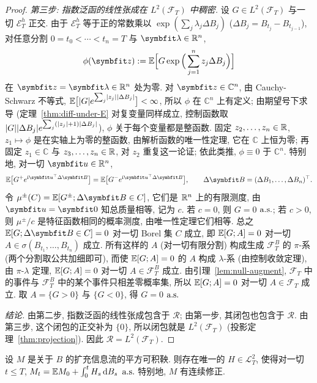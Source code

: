 \begin{proof}
\emph{第三步: 指数泛函的线性张成在 $L^2(\mathcal{F}_T)$ 中稠密.} 设 $G\in L^2(\mathcal{F}_T)$ 与一切 $\mathscr{E}^h_T$ 正交. 由于 $\mathscr{E}^h_T$ 等于正的常数乘以 $\exp(\sum_j\lambda_j\Delta B_j)$ ($\Delta B_j=B_{t_j}-B_{t_{j-1}}$), 对任意分割 $0=t_0<\cdots<t_n=T$ 与 $\rvec{\lambda}\in\R^n$,
\[
\phi(\rvec{z}):=\E\Big[G\exp\Big(\sum_{j=1}^nz_j\Delta B_j\Big)\Big]
\]
在 $\rvec{z}=\rvec{\lambda}\in\R^n$ 处为零. 对 $\rvec{z}\in\mathbb{C}^n$, 由 Cauchy-Schwarz 不等式, $\mathbb{E}\big[\lvert G\rvert e^{\sum_j\lvert z_j\rvert\lvert\Delta B_j\rvert}\big]<\infty$, 所以 $\phi$ 在 $\mathbb{C}^n$ 上有定义; 由期望号下求导 (定理~\ref{thm:diff-under-E} 对复变量同样成立, 控制函数取 $\lvert G\rvert\lvert\Delta B_j\rvert e^{\sum_j(\lvert z_j\rvert+1)\lvert\Delta B_j\rvert}$), $\phi$ 关于每个变量都是整函数. 固定 $z_2,\dots,z_n\in\mathbb{R}$, $z_1\mapsto\phi$ 是在实轴上为零的整函数, 由解析函数的唯一性定理, 它在 $\mathbb{C}$ 上恒为零; 再固定 $z_1\in\mathbb{C}$ 与 $z_3,\dots,z_n\in\mathbb{R}$, 对 $z_2$ 重复这一论证; 依此类推, $\phi\equiv0$ 于 $\mathbb{C}^n$. 特别地, 对一切 $\rvec{u}\in\R^n$,
\[
\E\big[G^+e^{\mathrm{i}\rvec{u}^\T\Delta\rvec{B}}\big]=\E\big[G^-e^{\mathrm{i}\rvec{u}^\T\Delta\rvec{B}}\big],\qquad\Delta\rvec{B}=(\Delta B_1,\dots,\Delta B_n)^\T.
\]
令 $\mu^\pm(C)=\E[G^\pm;\Delta\rvec{B}\in C]$, 它们是 $\mathbb{R}^n$ 上的有限测度, 由 $\rvec{u}=\rvec{0}$ 知总质量相等, 记为 $c$. 若 $c=0$, 则 $G=0$ $\text{a.s.}$; 若 $c>0$, 则 $\mu^\pm/c$ 是特征函数相同的概率测度, 由唯一性定理它们相等. 总之 $\E[G;\Delta\rvec{B}\in C]=0$ 对一切 Borel 集 $C$ 成立, 即 $\mathbb{E}[G;A]=0$ 对一切 $A\in\sigma(B_{t_1},\dots,B_{t_n})$ 成立. 所有这样的 $A$ (对一切有限分割) 构成生成 $\mathcal{F}^B_T$ 的 $\pi$-系 (两个分割取公共加细即可), 而使 $\mathbb{E}[G;A]=0$ 的 $A$ 构成 $\lambda$-系 (由控制收敛定理), 由 $\pi$-$\lambda$ 定理, $\mathbb{E}[G;A]=0$ 对一切 $A\in\mathcal{F}^B_T$ 成立. 由引理~\ref{lem:null-augment}, $\mathcal{F}_T$ 中的事件与 $\mathcal{F}^B_T$ 中的某个事件只相差零概率集, 所以 $\mathbb{E}[G;A]=0$ 对一切 $A\in\mathcal{F}_T$ 成立. 取 $A=\{G>0\}$ 与 $\{G<0\}$, 得 $G=0$ $\text{a.s.}$

\emph{结论.} 由第二步, 指数泛函的线性张成包含于 $\mathscr{R}$; 由第一步, 其闭包也包含于 $\mathscr{R}$. 由第三步, 这个闭包的正交补为 $\{0\}$, 所以闭包就是 $L^2(\mathcal{F}_T)$ (投影定理~\ref{thm:projection}). 因此 $\mathscr{R}=L^2(\mathcal{F}_T)$.
\end{proof}

\begin{corollary}[布朗信息流下的鞅]\label{cor:mart-rep}
设 $M$ 是关于 $B$ 的扩充信息流的平方可积鞅. 则存在唯一的 $H\in\mathscr{L}^2_T$, 使得对一切 $t\le T$, $M_t=\mathbb{E} M_0+\int_0^tH_s\mathop{}\!\mathrm{d} B_s$ $\text{a.s.}$ 特别地, $M$ 有连续修正.
\end{corollary}

